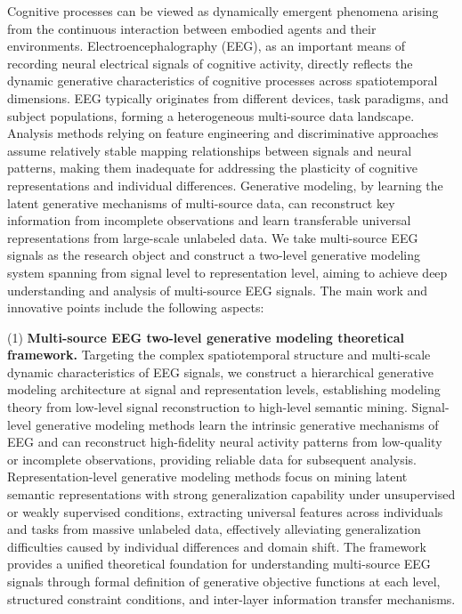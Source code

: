 \begin{eabstract}
Cognitive processes can be viewed as dynamically emergent phenomena arising from the continuous interaction between embodied agents and their environments. Electroencephalography (EEG), as an important means of recording neural electrical signals of cognitive activity, directly reflects the dynamic generative characteristics of cognitive processes across spatiotemporal dimensions. EEG typically originates from different devices, task paradigms, and subject populations, forming a heterogeneous multi-source data landscape.
Analysis methods relying on feature engineering and discriminative approaches assume relatively stable mapping relationships between signals and neural patterns, making them inadequate for addressing the plasticity of cognitive representations and individual differences.
Generative modeling, by learning the latent generative mechanisms of multi-source data, can reconstruct key information from incomplete observations and learn transferable universal representations from large-scale unlabeled data.
We take multi-source EEG signals as the research object and construct a two-level generative modeling system spanning from signal level to representation level, aiming to achieve deep understanding and analysis of multi-source EEG signals. The main work and innovative points include the following aspects:

(1) \textbf{Multi-source EEG two-level generative modeling theoretical framework.} Targeting the complex spatiotemporal structure and multi-scale dynamic characteristics of EEG signals, we construct a hierarchical generative modeling architecture at signal and representation levels, establishing modeling theory from low-level signal reconstruction to high-level semantic mining. Signal-level generative modeling methods learn the intrinsic generative mechanisms of EEG and can reconstruct high-fidelity neural activity patterns from low-quality or incomplete observations, providing reliable data for subsequent analysis. Representation-level generative modeling methods focus on mining latent semantic representations with strong generalization capability under unsupervised or weakly supervised conditions, extracting universal features across individuals and tasks from massive unlabeled data, effectively alleviating generalization difficulties caused by individual differences and domain shift. The framework provides a unified theoretical foundation for understanding multi-source EEG signals through formal definition of generative objective functions at each level, structured constraint conditions, and inter-layer information transfer mechanisms.


\end{eabstract}

